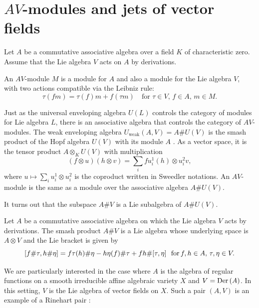 \documentclass[12pt]{amsart}
\begin{document}
\section{$AV$-modules and jets of vector fields}

Let $A$ be a commutative associative algebra over a field $K$ of characteristic zero.
Assume that the Lie algebra $V$ acts on $A$ by derivations.

\begin{definition}
\label{AV}
An $AV$-module $M$ is a module for $A$ and also a module for the Lie algebra $V$, with two actions compatible via the Leibniz rule:
\begin{equation}
\label{Leibniz}
\tau (f m) = \tau(f) m + f ( \tau m) \quad \text{for \ } \tau\in V, \, f \in A, \, m \in M.
\end{equation}
\end{definition} 

Just as the universal enveloping algebra $U(L)$ controls the category of modules for Lie algebra $L$, there is an associative algebra that controls the category of $AV$-modules. The weak enveloping algebra $U_{\text{weak}}(A, V) = A \# U(V)$ is the smash product of the Hopf algebra $U(V)$ with its module $A$ \cite{Jac}. As a vector space, it is the tensor product $A \otimes_K U(V)$ with multiplication 
$$(f \otimes u) (h \otimes v) = \sum\limits_i f u_i^1 (h) \otimes u_i^2 v,$$
where $u \mapsto  \sum\limits_i  u_i^1 \otimes  u_i^2$ is the coproduct written in Sweedler notations.
An $AV$-module is the same as a module over the associative algebra $A \# U(V)$.

It turns out that the subspace $A\#V$ is a Lie subalgebra of $A \# U(V)$.

\begin{definition}
Let $A$ be a commutative associative algebra on which the Lie algebra $V$ acts by derivations. The smash product $A \# V$ is a Lie algebra whose underlying space is $A \otimes V$ and the Lie bracket is given by
\begin{equation}
\label{smash}
[f \# \tau, h \# \eta] = f \tau(h) \# \eta - h \eta(f) \# \tau + fh \# [\tau, \eta] \ \ \text{for\,}
f, h \in A, \, \tau,\eta \in V.
\end{equation}
\end{definition}

We are particularly interested in the case where $A$ is the algebra of regular functions on a smooth irreducible affine algebraic variety $X$ and $V = \textup{Der\,}(A)$.  In this setting, $V$ is the Lie algebra of vector fields on $X$.
Such a pair $(A, V)$ is an example of a Rinehart pair \cite{Ri}:
\end{document}
